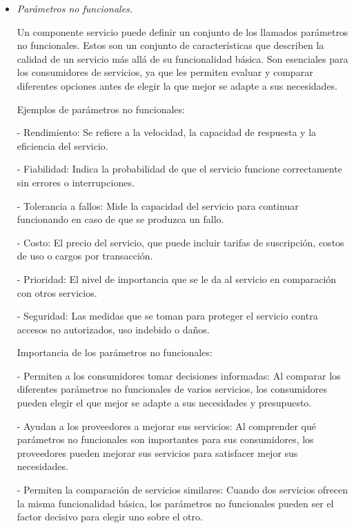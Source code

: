 \begin{itemize}
\item \textit{Parámetros no funcionales.} 



Un componente servicio puede definir un conjunto de los llamados parámetros no funcionales. Estos son un conjunto de características que describen la calidad de un servicio más allá de su funcionalidad básica. Son esenciales para los consumidores de servicios, ya que les permiten evaluar y comparar diferentes opciones antes de elegir la que mejor se adapte a sus necesidades.

Ejemplos de parámetros no funcionales:

- Rendimiento: Se refiere a la velocidad, la capacidad de respuesta y la eficiencia del servicio.

- Fiabilidad: Indica la probabilidad de que el servicio funcione correctamente sin errores o interrupciones.

- Tolerancia a fallos: Mide la capacidad del servicio para continuar funcionando en caso de que se produzca un fallo.

- Costo: El precio del servicio, que puede incluir tarifas de suscripción, costos de uso o cargos por transacción.

- Prioridad: El nivel de importancia que se le da al servicio en comparación con otros servicios.

- Seguridad: Las medidas que se toman para proteger el servicio contra accesos no autorizados, uso indebido o daños.


Importancia de los parámetros no funcionales:

- Permiten a los consumidores tomar decisiones informadas: Al comparar los diferentes parámetros no funcionales de varios servicios, los consumidores pueden elegir el que mejor se adapte a sus necesidades y presupuesto.

- Ayudan a los proveedores a mejorar sus servicios: Al comprender qué parámetros no funcionales son importantes para sus consumidores, los proveedores pueden mejorar sus servicios para satisfacer mejor sus necesidades.

- Permiten la comparación de servicios similares: Cuando dos servicios ofrecen la misma funcionalidad básica, los parámetros no funcionales pueden ser el factor decisivo para elegir uno sobre el otro.


\end{itemize}


